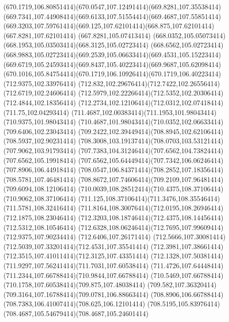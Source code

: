 {{	\curveto(670.1719,106.80851414)(670.0547,107.12491414)(669.8281,107.35538414)
	\curveto(669.7341,107.44908414)(669.6133,107.51554414)(669.4687,107.55851414)
	\curveto(669.3203,107.59761414)(669.125,107.62101414)(668.875,107.62101414)
	\lineto(667.8281,107.62101414)
	\lineto(667.8281,105.07413414)
	\curveto(668.0352,105.05073414)(668.1953,105.03503414)(668.3125,105.02723414)
	\lineto(668.6562,105.02723414)
	\curveto(668.9883,105.02723414)(669.2539,105.06633414)(669.4531,105.15223414)
	\curveto(669.6719,105.24593414)(669.8437,105.40223414)(669.9687,105.62098414)
	\curveto(670.1016,105.84754414)(670.1719,106.10926414)(670.1719,106.40223414)
	\closepath
	\moveto(712.9375,102.33976414)
	\curveto(712.832,102.29676414)(712.7422,102.26556414)(712.6719,102.24606414)
	\curveto(712.5979,102.22266414)(712.5352,102.20306414)(712.4844,102.18356414)
	\curveto(712.2734,102.12106414)(712.0312,102.07418414)(711.75,102.04293414)
	\curveto(711.4687,102.00383414)(711.1953,101.98043414)(710.9375,101.98043414)
	\curveto(710.4687,101.98043414)(710.0352,102.06633414)(709.6406,102.23043414)
	\curveto(709.2422,102.39449414)(708.8945,102.62106414)(708.5937,102.90231414)
	\curveto(708.3008,103.19137414)(708.0703,103.53121414)(707.9062,103.91793414)
	\curveto(707.7383,104.31246414)(707.6562,104.73824414)(707.6562,105.19918414)
	\curveto(707.6562,105.64449414)(707.7342,106.06246414)(707.8906,106.44918414)
	\curveto(708.0547,106.84371414)(708.2852,107.18356414)(708.5781,107.46481414)
	\curveto(708.8672,107.74606414)(709.2109,107.96481414)(709.6094,108.12106414)
	\curveto(710.0039,108.28512414)(710.4375,108.37106414)(710.9062,108.37106414)
	\curveto(711.125,108.37106414)(711.3476,108.35546414)(711.5781,108.32416414)
	\curveto(711.8164,108.30076414)(712.0195,108.26946414)(712.1875,108.23046414)
	\curveto(712.3203,108.18746414)(712.4375,108.14456414)(712.5312,108.10546414)
	\curveto(712.6328,108.06246414)(712.7695,107.99609414)(712.9375,107.90234414)
	\lineto(712.6406,107.26171414)
	\curveto(712.5666,107.30081414)(712.5039,107.33201414)(712.4531,107.35541414)
	\curveto(712.3981,107.38661414)(712.3515,107.41011414)(712.3125,107.43351414)
	\curveto(712.1328,107.50381414)(711.9297,107.56241414)(711.7031,107.60538414)
	\curveto(711.4726,107.64448414)(711.2344,107.66788414)(710.9844,107.66788414)
	\curveto(710.5469,107.66788414)(710.1758,107.60538414)(709.875,107.48038414)
	\curveto(709.582,107.36320414)(709.3164,107.16788414)(709.0781,106.88663414)
	\curveto(708.8906,106.66788414)(708.7383,106.41007414)(708.625,106.12101414)
	\curveto(708.5195,105.83976414)(708.4687,105.54679414)(708.4687,105.24601414)
}}
